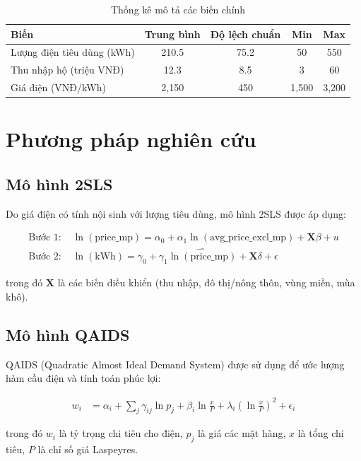 \documentclass[12pt,a4paper]{article}
\begin{document}
	\begin{table}[H]
		\centering
		\caption{Thống kê mô tả các biến chính}
		\begin{tabular}{lcccc}
			\toprule
			Biến & Trung bình & Độ lệch chuẩn & Min & Max \\
			\midrule
			Lượng điện tiêu dùng (kWh) & 210.5 & 75.2 & 50 & 550 \\
			Thu nhập hộ (triệu VNĐ) & 12.3 & 8.5 & 3 & 60 \\
			Giá điện (VNĐ/kWh) & 2,150 & 450 & 1,500 & 3,200 \\
			\bottomrule
		\end{tabular}
	\end{table}
	
	\section{Phương pháp nghiên cứu}
	\subsection{Mô hình 2SLS}
	Do giá điện có tính nội sinh với lượng tiêu dùng, mô hình 2SLS được áp dụng:
	
	\begin{align*}
		\text{Bước 1: } & \ln(\text{price\_mp}) = \alpha_0 + \alpha_1 \ln(\text{avg\_price\_excl\_mp}) + \mathbf{X}\beta + u \\
		\text{Bước 2: } & \ln(\text{kWh}) = \gamma_0 + \gamma_1 \widehat{\ln(\text{price\_mp})} + \mathbf{X}\delta + \epsilon
	\end{align*}
	
	trong đó $\mathbf{X}$ là các biến điều khiển (thu nhập, đô thị/nông thôn, vùng miền, mùa khô).
	
	\subsection{Mô hình QAIDS}
	QAIDS (Quadratic Almost Ideal Demand System) được sử dụng để ước lượng hàm cầu điện và tính toán phúc lợi:
	
	\begin{align*}
		w_i &= \alpha_i + \sum_j \gamma_{ij} \ln p_j + \beta_i \ln \frac{x}{P} + \lambda_i \left(\ln \frac{x}{P}\right)^2 + \epsilon_i
	\end{align*}
	
	trong đó $w_i$ là tỷ trọng chi tiêu cho điện, $p_j$ là giá các mặt hàng, $x$ là tổng chi tiêu, $P$ là chỉ số giá Laspeyres.
	
\end{document}
